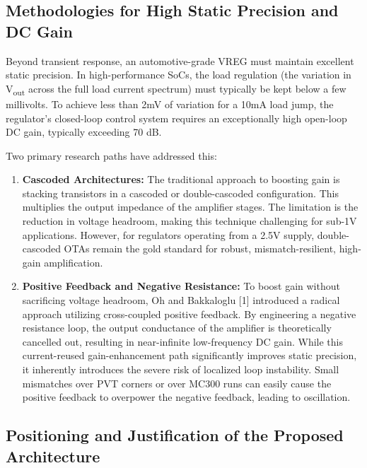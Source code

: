 \documentclass[
]{article}
\begin{document}
\subsection{Methodologies for High Static Precision and DC
Gain}\label{_methodologies_for_high_static_precision_and_dc_gain}

Beyond transient response, an automotive-grade VREG must maintain
excellent static precision. In high-performance SoCs, the load
regulation (the variation in V\textsubscript{out} across the full load
current spectrum) must typically be kept below a few millivolts. To
achieve less than 2mV of variation for a 10mA load jump, the regulator's
closed-loop control system requires an exceptionally high open-loop DC
gain, typically exceeding 70 dB.

Two primary research paths have addressed this:

\begin{enumerate}
\def\labelenumi{\arabic{enumi}.}
\item
  \textbf{Cascoded Architectures:} The traditional approach to boosting
  gain is stacking transistors in a cascoded or double-cascoded
  configuration. This multiplies the output impedance of the amplifier
  stages. The limitation is the reduction in voltage headroom, making
  this technique challenging for sub-1V applications. However, for
  regulators operating from a 2.5V supply, double-cascoded OTAs remain
  the gold standard for robust, mismatch-resilient, high-gain
  amplification.
\item
  \textbf{Positive Feedback and Negative Resistance:} To boost gain
  without sacrificing voltage headroom, Oh and Bakkaloglu {[}1{]}
  introduced a radical approach utilizing cross-coupled positive
  feedback. By engineering a negative resistance loop, the output
  conductance of the amplifier is theoretically cancelled out, resulting
  in near-infinite low-frequency DC gain. While this current-reused
  gain-enhancement path significantly improves static precision, it
  inherently introduces the severe risk of localized loop instability.
  Small mismatches over PVT corners or over MC300 runs can easily cause
  the positive feedback to overpower the negative feedback, leading to
  oscillation.
\end{enumerate}

\subsection{Positioning and Justification of the Proposed
Architecture}\label{_positioning_and_justification_of_the_proposed_architecture}
\end{document}
